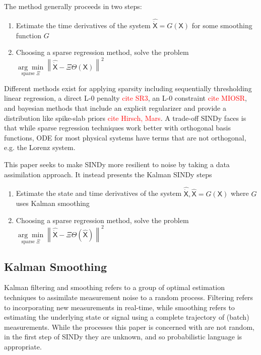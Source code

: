 \documentclass{article}
\newcommand{\red}[1]{\textcolor{red}{#1}}
\newcommand{\mat}[1]{\boldsymbol{\mathsf{#1}}}
\begin{document}
The method generally proceeds in two steps:

\begin{enumerate}
    \item Estimate the time derivatives of the system ${\mat{\widehat{\dot X}}} = G(\mat X)$ for some smoothing function $G$
    \item Choosing a sparse regression method, solve the problem $\underset{\text{sparse } \mat \Xi}{\arg\min} \left\| \mat{\widehat{\dot{X}}} - \mat \Xi \mat \Theta(\mat X) \right\|^2$
\end{enumerate}
Different methods exist for applying sparsity including sequentially thresholding linear regression, a direct L-0 penalty \red{cite SR3}, an L-0 constraint \red{cite MIOSR}, and bayesian methods that include an explicit regularizer and provide a distribution like spike-slab priors \red{cite Hirsch, Mars}.  A trade-off SINDy faces is that while sparse regression techniques work better with orthogonal basis functions, ODE for most physical systems have terms that are not orthogonal, e.g. the Lorenz system.

This paper seeks to make SINDy more resilient to noise by taking a data assimilation approach.  It instead presents the Kalman SINDy steps
\begin{enumerate}
    \item Estimate the state and time derivatives of the system ${\mat{\widehat{\dot X}}}, \mat{\widehat X} = G(\mat X)$ where $G$ uses Kalman smoothing
    \item Choosing a sparse regression method, solve the problem $\underset{\text{sparse } \mat \Xi}{\arg\min} \left\| \mat{\widehat{\dot{X}}} - \mat \Xi \mat \Theta(\mat {\widehat X}) \right\|^2$
\end{enumerate}

\subsection{Kalman Smoothing}

Kalman filtering and smoothing refers to a group of optimal estimation techniques to assimilate measurement noise to a random process.
Filtering refers to incorporating  new measurements in real-time, while smoothing refers to estimating the underlying state or signal using a complete trajectory of (batch) measurements.
While the processes this paper is concerned with are not random, in the first step of SINDy they are unknown, and so probabilistic language is appropriate.
\end{document}
